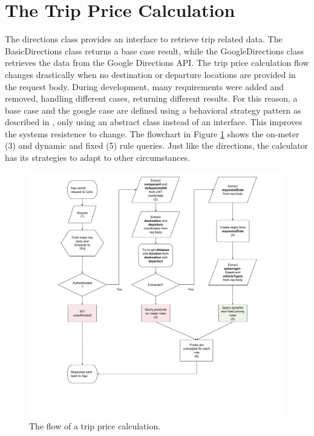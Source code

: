 %
\section{The Trip Price Calculation}
The directions class provides an interface to retrieve trip related data. The BasicDirections class returns a base case result, while the GoogleDirections class retrieves the data from the Google Directions API. The trip price calculation flow changes drastically when no destination or departure locations are provided in the request body. During development, many requirements were added and removed, handling different cases, returning different results. For this reason, a base case and the google case are defined using a behavioral strategy pattern as described in \cite{gof}, only using an abstract class instead of an interface. This improves the systems resistence to change. The flowchart in Figure \ref{fig:Calculation} shows the on-meter (3) and dynamic and fixed (5) rule queries. Just like the directions, the calculator has its strategies to adapt to other circumstances.

\begin{figure}[H]
	\centering
	\includegraphics[width=1\textwidth]{Calculation}
	\caption[Calculation Flow]{The flow of a trip price calculation.}
	\label{fig:Calculation}
\end{figure}

